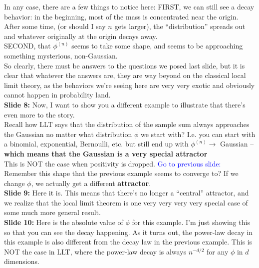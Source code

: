 \documentclass[11pt]{article}
\begin{document}
In any case, there are a few things to notice here: FIRST, we can still see a decay behavior: in the beginning, most of the mass is concentrated near the origin. After some time, (or should I say $n$ gets larger), the ``distribution'' spreads out and whatever originally at the origin decays away. \\


SECOND, that $\phi^{(n)}$ seems to take some shape, and seems to be approaching something mysterious, non-Gaussian. \\


So clearly, there must be answers to the questions we posed last slide, but it is clear that whatever the answers are, they are way beyond on the classical local limit theory, as the behaviors we're seeing here are very very exotic and obviously cannot happen in probability land. \\

\noindent \textbf{Slide 8:} Now, I want to show you a different example to illustrate that there's even more to the story. \\

Recall how LLT says that the distribution of the sample sum always approaches the Gaussian no matter what distribution $\phi$ we start with? I.e. you can start with a binomial, exponential, Bernoulli, etc. but still end up with $\phi^{(n)} \to$ Gaussian -- \textbf{which means that the Gaussian is a very special attractor} \\


This is NOT the case when positivity is dropped. \textcolor{blue}{Go to previous slide:} Remember this shape that the previous example seems to converge to? If we change $\phi$, we actually get a different \textbf{attractor}. \\



\noindent \textbf{Slide 9:} Here it is. This means that there's no longer a ``central'' attractor, and we realize that the local limit theorem is one very very very very special case of some much more general result. \\


\noindent \textbf{Slide 10:} Here is the absolute value of $\phi$ for this example. I'm just showing this so that you can see the decay happening. As it turns out, the power-law decay in this example is also different from the decay law in the previous example. This is NOT the case in LLT, where the power-law decay is always $n^{-d/2}$ for any  $\phi$ in $d$ dimensions. \\
\end{document}

